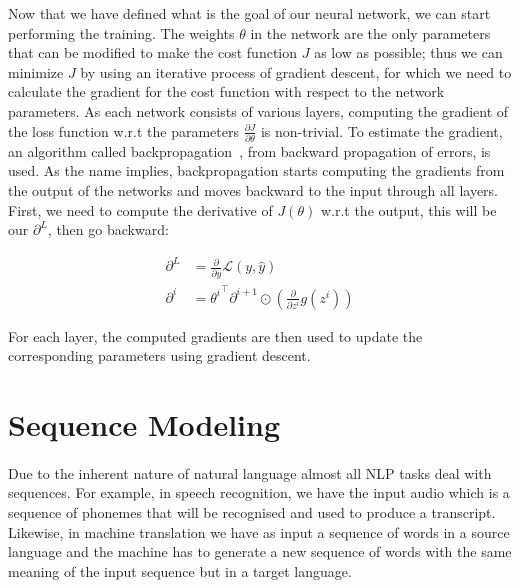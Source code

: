 Now that we have defined what is the goal of our neural network, we can start performing the training. %
The weights $\theta$ in the network are the only parameters that can be modified to make the cost function $J$ as low as possible; thus we can minimize $J$ by using an iterative process of gradient descent, for which we need to calculate the gradient for the cost function with respect to the network parameters.  As each network consists of various layers, computing the gradient of the loss function w.r.t the parameters $\frac{\partial J}{\partial \theta}$ is non-trivial. To estimate the gradient, an algorithm called backpropagation~\citep{rumelhart1988learning}, from backward propagation of errors, is used. As the name implies, backpropagation starts computing the gradients from the output of the networks and moves backward to the input through all layers. First, we need to compute the derivative of $J(\theta)$ w.r.t the output, this will be our $\partial^{L}$, then go backward:




\begin{equation}
\begin{split}
    \partial^{L} & = \frac{\partial}{\partial y} \mathcal{L}(y, \hat{y}) \\
    \partial^i &= {\theta^{i}}^\intercal \partial^{i+1} \odot \left(\frac{\partial}{\partial z^{i}} g(z^i)\right)
\end{split}
\label{eq:backpropagation}    
\end{equation}

For each layer, the computed gradients are then used to update the corresponding parameters using gradient descent.

\section{Sequence Modeling}
\label{sec:sequence_modeling}


\paragraph{}
Due to the inherent nature of natural language almost all NLP tasks deal with sequences. For example, in speech recognition, we have the input audio which is a sequence of phonemes that will be recognised and used to produce a transcript. Likewise, in machine translation we have as input a sequence of words in a source language and the machine has to generate a new sequence of words with the same meaning of the input sequence but in a target language.


